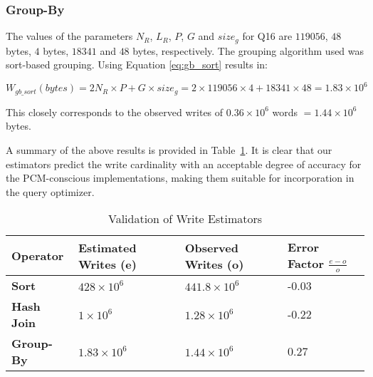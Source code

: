   
\subsubsection{Group-By}
The values of the parameters $N_R$, $L_R$, $P$, $G$ and $size_g$ for Q16
are $119056$, $48$ bytes, $4$ bytes, $18341$ and $48$ bytes, respectively.  
The grouping algorithm used was sort-based grouping. Using Equation \ref{eq:gb_sort} results in:
\begin{small}
$$W_{gb\_sort}(bytes) = 2N_R \times P + G \times size_g = 2 \times 119056\times 4 + 18341 \times 48
= 1.83 \times 10^6$$
\end{small}
This closely corresponds to the observed writes of $0.36 \times 10^6$ words $= 1.44 \times 10^6$ bytes.

A summary of the above results is provided in
Table~\ref{tab:estimator_validation}. It is clear that our estimators
predict the write cardinality with an acceptable degree of accuracy for
the PCM-conscious implementations, making them suitable for incorporation
in the query optimizer.

\begin{table}[!h]                                                                                       
\centering                                                                                              
\caption{Validation of Write Estimators}
  \label{tab:estimator_validation}                                                                                
  \begin{small}                                                                                           
  \begin{tabular}{p{3cm}p{3cm}p{3cm}p{2.5cm}}
  \toprule                                                                                                
  
  \textbf{Operator} & \textbf{Estimated Writes} (e) & \textbf{Observed Writes} (o) & \textbf{Error Factor} $\frac{e-o}{o}$\\
  \midrule                                                                                                
  
    \textbf{Sort} &  $428 \times 10^6$ & $441.8 \times 10^6$ & -0.03\\ 
  \textbf{Hash Join} &  $1 \times 10^6$ & $1.28 \times 10^6$ & -0.22\\ 
  \textbf{Group-By} &  $1.83 \times 10^6$ &$1.44 \times 10^6$ & 0.27\\ 
  
  \bottomrule                                                                                             
  \end{tabular}                                                                                           
  \end{small}                                                                                             
  \end{table} 





